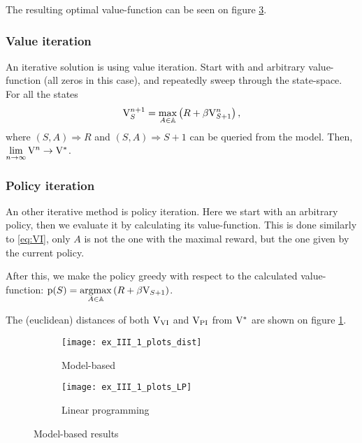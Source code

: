 The resulting optimal value-function can be seen on figure \ref{fig:LP}.

\subsubsection{Value iteration}

An iterative solution is using value iteration.
Start with and arbitrary value-function (all zeros in this case),
and repeatedly sweep through the state-space. For all the states
\begin{equation}\label{eq:VI}
	\mathrm{V}_S^{n+1} = \max\limits_{A\in\mathbb{A}}\left(R + \beta\mathrm{V}_{S+1}^n\right),
\end{equation}
where $(S,A)\Rightarrow R$ and $(S,A)\Rightarrow S+1$
can be queried from the model.
Then, $\lim\limits_{n\rightarrow\infty}\mathrm{V}^n\rightarrow\mathrm{V}^*$.

\subsubsection{Policy iteration}\label{sssec:PI}

An other iterative method is policy iteration.
Here we start with an arbitrary policy, then we evaluate it by calculating its value-function.
This is done similarly to \ref{eq:VI}, only $A$ is not the one with the maximal reward,
but the one given by the current policy.

After this, we make the policy greedy with respect to the calculated value-function:
$\mathrm{p}(S)=\underset{A\in\mathbb{A}}{\operatorname{argmax}}\left(R + \beta\mathrm{V}_{S+1}\right)$.

The (euclidean) distances of both $\mathrm{V}_\text{VI}$ and $\mathrm{V}_\text{PI}$ from $\mathrm{V}^*$ are
shown on figure \ref{fig:dist-1}.

\begin{figure}[H]
	\centering
	\begin{subfigure}{.45\textwidth}
		\centering
		\texttt{[image: ex\_III\_1\_plots\_dist]}
		\caption{Model-based}
		\label{fig:dist-1}
	\end{subfigure}
	\begin{subfigure}{.45\textwidth}
		\centering
		\texttt{[image: ex\_III\_1\_plots\_LP]}
		\caption{Linear programming}
		\label{fig:LP}
	\end{subfigure}
	\caption{Model-based results}
\end{figure}


